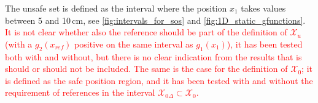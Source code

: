 %
%
%
%
%
The unsafe set is defined as the interval where the position $x_1$ takes values between 5 and 10\,cm, see \autoref{fig:intervals_for_sos} and \ref{fig:1D_static_gfunctions}. \textcolor{red}{It is not clear whether also the reference should be part of the definition of $\mathcal{X}_u$ (with a $g_2(x_{ref})$ positive on the same interval as $g_1(x_1)$), it has been tested both with and without, but there is no clear indication from the results that is should or should not be included.}
%
%
%
%
%
\textcolor{red}{The same is the case for the definition of $\mathcal{X}_0$; it is defined as the safe position region, and it has been tested with and without the requirement of references in the interval $\mathcal{X}_{0\Delta} \subset \mathcal{X}_0$.}
